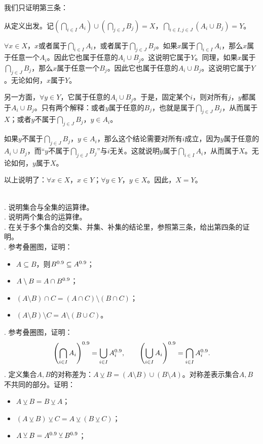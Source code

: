 \documentclass[12pt,UTF8,fontset=none]{ctexbook}
\begin{document}
我们只证明第三条：
\begin{so}
    从定义出发。记$\left(\bigcap_{i\in I} A_i \right) \cup  \left(\bigcap_{j\in J} B_j \right) = X$，$\bigcap_{i\in I,j\in J} (A_i \cup B_j) = Y$。
    
    $\forall x \in X$，$x$或者属于$\bigcap_{i\in I} A_i$，或者属于$\bigcap_{j\in J} B_j$。如果$x$属于$\bigcap_{i\in I} A_i$，那么$x$属于任意一个$A_i$。因此它也属于任意的$A_i \cup B_j$。这说明它属于$Y$。同理，如果$x$属于$\bigcap_{j\in J} B_j$，那么$x$属于任意一个$B_j$。因此它也属于任意的$A_i \cup B_j$。这说明它属于$Y$。无论如何，$x$属于$Y$。

    另一方面，$\forall y \in Y$，它属于任意的$A_i \cup B_j$。于是，固定某个$i$，则对所有$j$，$y$都属于$A_i \cup B_j$。只有两个解释：或者$y$属于任意的$B_j$，也就是属于$\bigcap_{j\in J} B_j$，从而属于$X$；或者$y$不属于$\bigcap_{j\in J} B_j$，$y\in A_i$。
    
    如果$y$不属于$\bigcap_{j\in J} B_j$，$y\in A_i$，那么这个结论需要对所有$i$成立，因为$y$属于任意的$A_i \cup B_j$，而“$y$不属于$\bigcap_{j\in J} B_j$”与$i$无关。这就说明$y$属于$\bigcap_{i\in I} A_i$，从而属于$X$。无论如何，$y$属于$X$。

    以上说明了：$\forall x \in X$，$x\in Y$；$\forall y \in Y$，$y\in X$。因此，$X=Y$。

\end{so}

\begin{xt}
    \mbox{} \\
    . 说明集合与全集的运算律。\\
    . 说明两个集合的运算律。\\
    . 在关于多个集合的交集、并集、补集的结论里，参照第三条，给出第四条的证明。\\
    . 参考叠圈图，证明：
    \begin{itemize}
        \item $A \subseteq B$，则$B^{0.9} \subseteq A^{0.9}$；
        \item $A \setminus B = A \cap B^{0.9}$；
        \item $(A \setminus B) \cap C = (A \cap C) \setminus (B \cap C)$；
        \item  $(A \setminus B) \setminus C = A \setminus (B \cup C)$。
    \end{itemize}   
    . 参考叠圈图，证明：
    $$ \left(\bigcap_{i\in I} A_i \right)^{0.9} = \bigcup_{i\in I} A_i^{0.9}, \quad\quad \left(\bigcup_{i\in I} A_i \right)^{0.9} = \bigcap_{i\in I} A_i^{0.9}.$$
    . 定义集合$A,B$的对称差为：$A \veebar B = (A \setminus B) \cup (B \setminus A)$。对称差表示集合$A,B$不共同的部分。证明：
    \begin{itemize}
        \item $A \veebar B = B \veebar A $；
        \item $(A \veebar B) \veebar C = A \veebar (B \veebar C) $；
        \item $A \veebar B = A^{0.9} \veebar B^{0.9}$；
    \end{itemize}
\end{xt}
\end{document}
